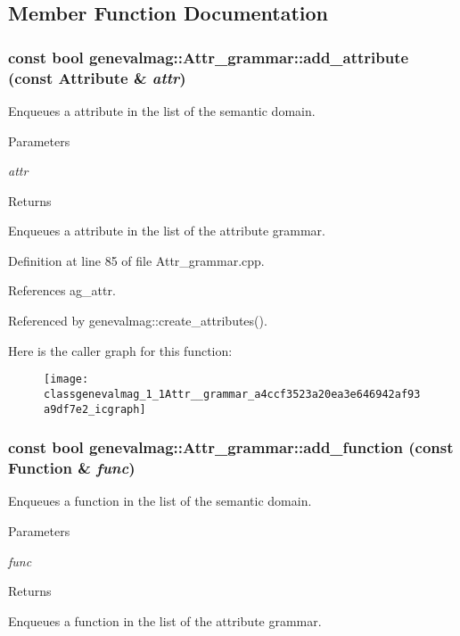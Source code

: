 \subsection{Member Function Documentation}
\hypertarget{classgenevalmag_1_1Attr__grammar_a4ccf3523a20ea3e646942af93a9df7e2}{
\subsubsection[{add\_\-attribute}]{\setlength{\rightskip}{0pt plus 5cm}const bool genevalmag::Attr\_\-grammar::add\_\-attribute (const {\bf Attribute} \& {\em attr})}}
\label{classgenevalmag_1_1Attr__grammar_a4ccf3523a20ea3e646942af93a9df7e2}
Enqueues a attribute in the list of the semantic domain. 
\begin{DoxyParams}{Parameters}
\item[{\em attr}]\end{DoxyParams}
\begin{DoxyReturn}{Returns}

\end{DoxyReturn}
Enqueues a attribute in the list of the attribute grammar. 

Definition at line 85 of file Attr\_\-grammar.cpp.



References ag\_\-attr.



Referenced by genevalmag::create\_\-attributes().



Here is the caller graph for this function:\nopagebreak
\begin{figure}[H]
\begin{center}
\leavevmode
\texttt{[image: classgenevalmag\_1\_1Attr\_\_grammar\_a4ccf3523a20ea3e646942af93a9df7e2\_icgraph]}
\end{center}
\end{figure}


\hypertarget{classgenevalmag_1_1Attr__grammar_a2dc3357532cdef0dd92eaf3f55ca2ec2}{
\subsubsection[{add\_\-function}]{\setlength{\rightskip}{0pt plus 5cm}const bool genevalmag::Attr\_\-grammar::add\_\-function (const {\bf Function} \& {\em func})}}
\label{classgenevalmag_1_1Attr__grammar_a2dc3357532cdef0dd92eaf3f55ca2ec2}
Enqueues a function in the list of the semantic domain. 
\begin{DoxyParams}{Parameters}
\item[{\em func}]\end{DoxyParams}
\begin{DoxyReturn}{Returns}

\end{DoxyReturn}
Enqueues a function in the list of the attribute grammar. 

